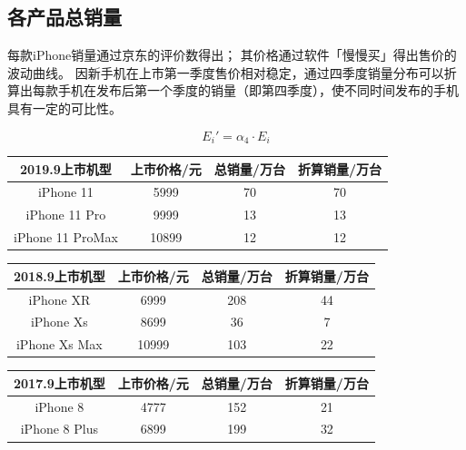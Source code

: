 \documentclass[12pt]{ctexart}
\begin{document}
        \subsection{各产品总销量}

            每款iPhone销量通过京东的评价数得出；
            其价格通过软件「慢慢买」得出售价的波动曲线。
            因新手机在上市第一季度售价相对稳定，通过四季度销量分布可以折算出每款手机在发布后第一个季度的销量（即第四季度），使不同时间发布的手机具有一定的可比性。

            \begin{equation} %
                E _i ' = \alpha _4 \cdot  E _i
            \end{equation} 

            

            \begin{center}
                \begin{tabular}{|c|ccc|}
                    \hline
                    2019.9上市机型 & 上市价格/元 & 总销量/万台 & 折算销量/万台\\
                    \hline
                    iPhone 11 &5999 &70 &70\\
                    \hline
                    iPhone 11 Pro&9999 &13&13\\
                    \hline
                    iPhone 11 ProMax&10899 &12&12\\
                    \hline
                \end{tabular}

                \begin{tabular}{|c|ccc|}
                    \hline
                    2018.9上市机型 & 上市价格/元 & 总销量/万台 & 折算销量/万台\\
                    \hline
                    iPhone XR  &6999 &208 &44\\
                    \hline
                    iPhone Xs &8699 &36&7\\
                    \hline
                    iPhone Xs Max&10999 &103&22\\
                    \hline
                \end{tabular}
                
                \begin{tabular}{|c|ccc|}
                    \hline
                    2017.9上市机型 & 上市价格/元 & 总销量/万台 & 折算销量/万台\\
                    \hline
                    iPhone 8 &4777 &152 &21\\
                    \hline
                    iPhone 8 Plus &6899 &199&32\\
                    \hline
                \end{tabular}
            \end{center}
\end{document}
